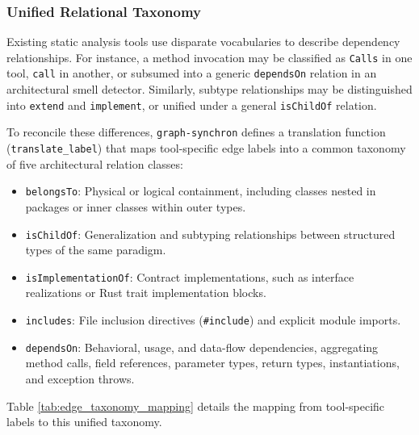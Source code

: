 \subsubsection{Unified Relational Taxonomy}
\label{subsec:edge_taxonomy_unification}

Existing static analysis tools use disparate vocabularies to describe
dependency relationships. For instance, a method invocation may be
classified as \texttt{Calls} in one tool, \texttt{call} in another,
or subsumed into a generic \texttt{dependsOn} relation in an
architectural smell detector. Similarly, subtype relationships may be
distinguished into \texttt{extend} and \texttt{implement}, or unified
under a general \texttt{isChildOf} relation.

To reconcile these differences, \texttt{graph-synchron} defines a
translation function (\texttt{translate\_label}) that maps
tool-specific edge labels into a common taxonomy of five
architectural relation classes:
\begin{itemize}
  \item \texttt{belongsTo}: Physical or logical containment,
    including classes nested in packages or inner classes within outer types.
  \item \texttt{isChildOf}: Generalization and subtyping
    relationships between structured types of the same paradigm.
  \item \texttt{isImplementationOf}: Contract implementations, such
    as interface realizations or Rust trait implementation blocks.
  \item \texttt{includes}: File inclusion directives
    (\texttt{\#include}) and explicit module imports.
  \item \texttt{dependsOn}: Behavioral, usage, and data-flow
    dependencies, aggregating method calls, field references,
    parameter types, return types, instantiations, and exception throws.
\end{itemize}

Table \ref{tab:edge_taxonomy_mapping} details the mapping from
tool-specific labels to this unified taxonomy.

